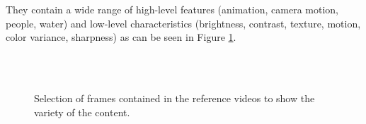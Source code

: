 They contain a wide range of high-level features (animation, camera motion, people, water) and low-level characteristics (brightness, contrast, texture, motion, color variance, sharpness) as can be seen in Figure \ref{fig:OverviewReferenceSequences}.

\begin{figure}[hbt!]
	\begin{center}

		\\ %
		\\ %
	\end{center}
	\caption{%
		Selection of frames contained in the reference videos to show the variety of the content.
	}%
	\label{fig:OverviewReferenceSequences}
\end{figure}

